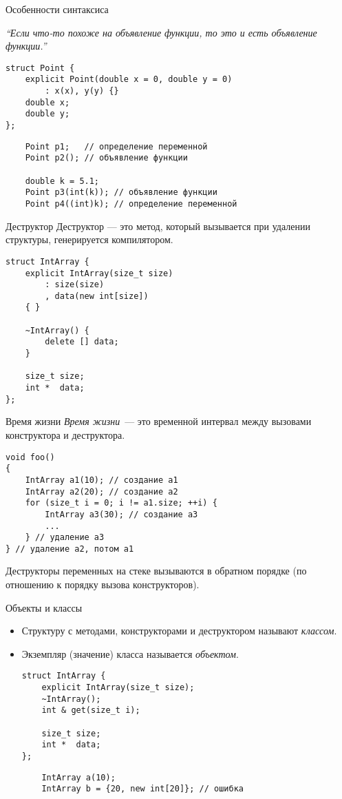 \documentclass{beamer}
\begin{document}
\begin{frame}[fragile]{Особенности синтаксиса \langcpp}

    {\em ``Если что-то похоже на объявление функции, то это
    и есть объявление функции.''}
\begin{lstlisting}
struct Point {
    explicit Point(double x = 0, double y = 0) 
        : x(x), y(y) {}
    double x;
    double y;
};
\end{lstlisting}
\begin{lstlisting}
    Point p1;   // определение переменной
    Point p2(); // объявление функции

    double k = 5.1;
    Point p3(int(k)); // объявление функции
    Point p4((int)k); // определение переменной
\end{lstlisting}
\end{frame}

\begin{frame}[fragile]{Деструктор}
    Деструктор — это метод, который вызывается при удалении структуры,
    генерируется компилятором.
\begin{lstlisting}
struct IntArray {
    explicit IntArray(size_t size)
        : size(size)
        , data(new int[size])
    { }

    ~IntArray() {
        delete [] data;
    }
    
    size_t size;
    int *  data;
};
\end{lstlisting}
\end{frame}

\begin{frame}[fragile]{Время жизни}{}
    {\em Время жизни}~--- это временной интервал 
    между вызовами конструктора и деструктора.
\begin{lstlisting}
void foo()
{
    IntArray a1(10); // создание a1
    IntArray a2(20); // создание a2 
    for (size_t i = 0; i != a1.size; ++i) {
        IntArray a3(30); // создание a3
        ...
    } // удаление a3
} // удаление a2, потом a1
\end{lstlisting}
Деструкторы переменных на стеке вызываются в обратном
порядке (по отношению к порядку вызова конструкторов).
\end{frame}

\begin{frame}[fragile]{Объекты и классы}
    \small
    \begin{itemize}
        \item Структуру с методами, конструкторами и деструктором
            называют {\em классом}.
        \item Экземпляр (значение) класса называется {\em объектом}.
\begin{lstlisting}
struct IntArray {
    explicit IntArray(size_t size);
    ~IntArray(); 
    int & get(size_t i);

    size_t size;
    int *  data;
};
\end{lstlisting}
\begin{lstlisting}
    IntArray a(10);
    IntArray b = {20, new int[20]}; // ошибка
\end{lstlisting}
    \end{itemize}
\end{frame}
\end{document}
